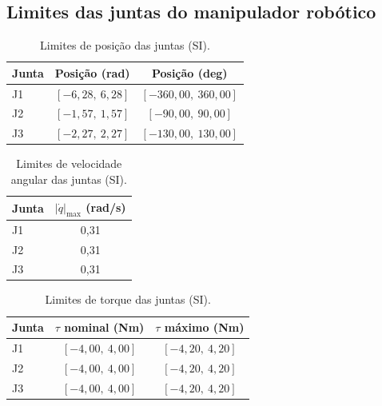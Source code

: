 \subsection{Limites das juntas do manipulador robótico}

\begin{table}[H]
\centering
\caption{Limites de posição das juntas (SI).}
\label{tab:chaser_lim_pos_SI}
\begin{tabular}{lcc}
\hline
\textbf{Junta} & \textbf{Posição (rad)} & \textbf{Posição (deg)} \\
\hline
J1 & $[-6,28,\ 6,28]$ & $[-360,00,\ 360,00]$ \\
J2 & $[-1,57,\ 1,57]$ & $[-90,00,\ 90,00]$ \\
J3 & $[-2,27,\ 2,27]$ & $[-130,00,\ 130,00]$ \\
\hline
\end{tabular}
\end{table}

\begin{table}[H]
\centering
\caption{Limites de velocidade angular das juntas (SI).}
\label{tab:chaser_lim_vel_SI}
\begin{tabular}{lc}
\hline
\textbf{Junta} & \textbf{$|\dot{q}|_{\max}$ (rad/s)} \\
\hline
J1 & 0,31 \\
J2 & 0,31 \\
J3 & 0,31 \\
\hline
\end{tabular}
\end{table}

\begin{table}[H]
\centering
\caption{Limites de torque das juntas (SI).}
\label{tab:chaser_lim_tau_SI}
\begin{tabular}{lcc}
\hline
\textbf{Junta} & \textbf{$\tau$ nominal (Nm)} & \textbf{$\tau$ máximo (Nm)} \\
\hline
J1 & $[-4,00,\ 4,00]$ & $[-4,20,\ 4,20]$ \\
J2 & $[-4,00,\ 4,00]$ & $[-4,20,\ 4,20]$ \\
J3 & $[-4,00,\ 4,00]$ & $[-4,20,\ 4,20]$ \\
\hline
\end{tabular}
\end{table}
